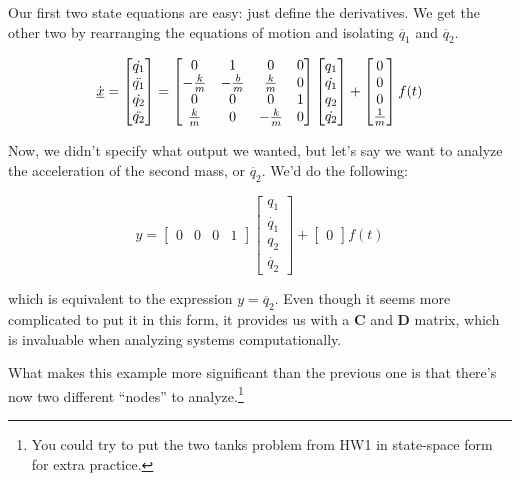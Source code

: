 \documentclass{report}
\begin{document}
\begin{onehalfspacing}
\begin{flushleft}
Our first two state equations are easy: just define the derivatives. We get the other two by rearranging the equations of motion and isolating \(\ddot{q_1}\) and \(\ddot{q_2}\).

\vspace{-0.1in}
\[\dot{\underbar{\(x\)}} = \begin{bmatrix}
    \dot{q_1} \\
    \ddot{q_1} \\
    \dot{q_2} \\ 
    \ddot{q_2}
  \end{bmatrix} = \begin{bmatrix}
    0 & 1 & 0 & 0\\
    -\frac{k}{m} & -\frac{b}{m} & \frac{k}{m} & 0 \\
    0 & 0 & 0 & 1\\
    \frac{k}{m} & 0 & -\frac{k}{m} & 0
\end{bmatrix} \begin{bmatrix}
    q_1 \\
    \dot{q_1} \\
    q_2 \\ 
    \dot{q_2} \end{bmatrix} + \begin{bmatrix}
        0 \\
    0 \\
    0 \\ 
    \frac{1}{m} \end{bmatrix} f(t)\]

Now, we didn't specify what output we wanted, but let's say we want to analyze the acceleration of the second mass, or \(\ddot{q_2}\). We'd do the following:

\vspace{-0.1in}
\[y = \begin{bmatrix} 0 & 0 & 0 & 1\end{bmatrix} \begin{bmatrix}
    q_1 \\
    \dot{q_1} \\
    q_2 \\ 
    \dot{q_2} \end{bmatrix} + \begin{bmatrix} 0 \end{bmatrix} f(t)\]

which is equivalent to the expression \(y = \ddot{q_2}\). Even though it seems more complicated to put it in this form, it provides us with a \textbf{C} and \textbf{D} matrix, which is invaluable when analyzing systems computationally.

\medskip

What makes this example more significant than the previous one is that there's now two different ``nodes'' to analyze.\footnote{You could try to put the two tanks problem from HW1 in state-space form for extra practice.}

\end{flushleft}
\end{onehalfspacing}
\end{document}
